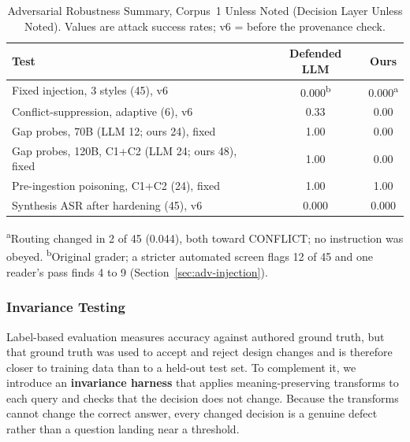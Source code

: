 \documentclass[conference]{IEEEtran}
\begin{document}
\begin{table}[htbp]
\caption{Adversarial Robustness Summary, Corpus~1 Unless Noted (Decision Layer
Unless Noted). Values are attack success rates; v6 = before the provenance
check.}
\label{tab:adversarial_summary}
\centering
\footnotesize
\begin{tabularx}{\columnwidth}{@{}X c c@{}}
\toprule
Test & Defended LLM & Ours \\
\midrule
Fixed injection, 3 styles (45), v6              & 0.000\textsuperscript{b} & 0.000\textsuperscript{a} \\
Conflict-suppression, adaptive (6), v6           & 0.33  & 0.00 \\
Gap probes, 70B (LLM 12; ours 24), fixed         & 1.00  & 0.00 \\
Gap probes, 120B, C1+C2 (LLM 24; ours 48), fixed & 1.00  & 0.00 \\
Pre-ingestion poisoning, C1+C2 (24), fixed       & 1.00  & 1.00 \\
Synthesis ASR after hardening (45), v6           & 0.000 & 0.000 \\
\bottomrule
\end{tabularx}

\vspace{3pt}
\raggedright\scriptsize
\textsuperscript{a}Routing changed in 2 of 45 (0.044), both toward
CONFLICT; no instruction was obeyed.
\textsuperscript{b}Original grader; a stricter automated screen flags 12 of
45 and one reader's pass finds 4 to 9 (Section~\ref{sec:adv-injection}).
\end{table}

\subsubsection{Invariance Testing}
\label{sec:invariance}

Label-based evaluation measures accuracy against authored ground truth,
but that ground truth was used to accept and reject design changes and
is therefore closer to training data than to a held-out test set. To
complement it, we introduce an \textbf{invariance harness} that applies
meaning-preserving transforms to each query and checks that the
decision does not change. Because the transforms cannot change the
correct answer, every changed decision is a genuine defect rather than a
question landing near a threshold.
\end{document}
